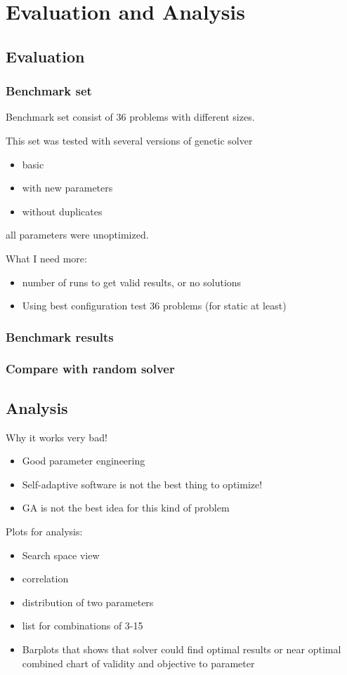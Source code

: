 \chapter{Evaluation and Analysis}

\section{Evaluation}
\subsection{Benchmark set}
Benchmark set consist of 36 problems with different sizes.

This set was tested with several versions of genetic solver
\begin{itemize}
	\item basic
	\item with new parameters
	\item without duplicates
\end{itemize}
all parameters were unoptimized.

What I need more:
\begin{itemize}
	\item number of runs to get valid results, or no solutions
	\item Using best configuration test 36 problems (for static at least)
\end{itemize}


\subsection{Benchmark results}
\subsection{Compare with random solver}

\section{Analysis}
Why it works very bad!
\begin{itemize}
	\item Good parameter engineering 
	\item Self-adaptive software is not the best thing to optimize!
	\item GA is not the best idea for this kind of problem
\end{itemize}

Plots for analysis:
\begin{itemize}
	\item Search space view
	\item correlation
	\item distribution of two parameters
	\item list for combinations of 3-15
	\item Barplots that shows that solver could find optimal results or near optimal 
	combined chart of validity and objective to parameter
	
\end{itemize}